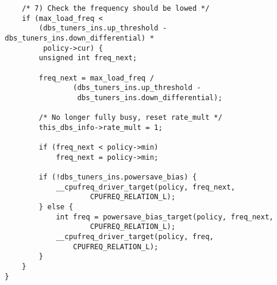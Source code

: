 \begin{lstlisting}
    /* 7) Check the frequency should be lowed */
    if (max_load_freq <
        (dbs_tuners_ins.up_threshold - dbs_tuners_ins.down_differential) *
         policy->cur) {
        unsigned int freq_next;

        freq_next = max_load_freq /
                (dbs_tuners_ins.up_threshold -
                 dbs_tuners_ins.down_differential);

        /* No longer fully busy, reset rate_mult */
        this_dbs_info->rate_mult = 1;

        if (freq_next < policy->min)
            freq_next = policy->min;

        if (!dbs_tuners_ins.powersave_bias) {
            __cpufreq_driver_target(policy, freq_next,
                    CPUFREQ_RELATION_L);
        } else {
            int freq = powersave_bias_target(policy, freq_next,
                    CPUFREQ_RELATION_L);
            __cpufreq_driver_target(policy, freq,
                CPUFREQ_RELATION_L);
        }
    }
}
\end{lstlisting}

